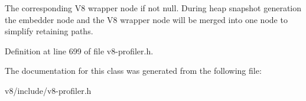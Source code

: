 The corresponding V8 wrapper node if not null. During heap snapshot generation the embedder node and the V8 wrapper node will be merged into one node to simplify retaining paths. 

Definition at line 699 of file v8-\/profiler.\+h.



The documentation for this class was generated from the following file\+:\begin{DoxyCompactItemize}
\item 
v8/include/v8-\/profiler.\+h\end{DoxyCompactItemize}
